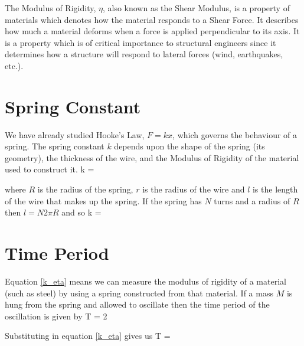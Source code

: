 The Modulus of Rigidity, $\eta$, also known as the Shear Modulus, is a property of materials which denotes how the material responds to a Shear Force. It describes how much a material deforms when a force is applied perpendicular to its axis. It is a property which is of critical importance to structural engineers since it determines how a structure will respond to lateral forces (wind, earthquakes, etc.).


\section*{Spring Constant}

We have already studied Hooke's Law, $F = k x$, which governs the behaviour of a spring. The spring constant $k$ depends upon the shape of the spring (its geometry), the thickness of the wire, and the Modulus of Rigidity of the material used to construct it.
%
\beq
    k = 
\eeq

where $R$ is the radius of the spring, $r$ is the radius of the wire and $l$ is the length of the wire that makes up the spring. If the spring has $N$ turns and a radius of $R$ then $l = N 2 \pi R$ and so
%
\beq \label{k_eta}
    k = 
\eeq


\section*{Time Period}

Equation \eqref{k_eta} means we can measure the modulus of rigidity of a material (such as steel) by using a spring constructed from that material. If a mass $M$ is hung from the spring and allowed to oscillate then the time period of the oscillation is given by
%
\beq
    T = 2 \pi {}
\eeq

Substituting in equation \eqref{k_eta} gives us
%
\beq
    T =  
\eeq
